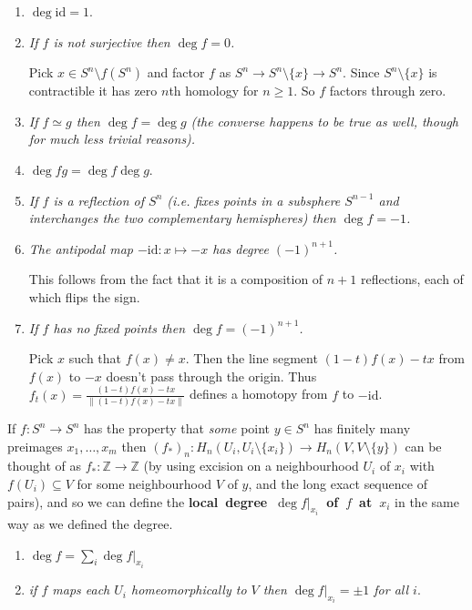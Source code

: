 \documentclass[10pt]{article}
\newcommand{\zz}{\mathbb{Z}}
\newcommand{\id}{\mathrm{id}}
\begin{document}
            \begin{enumerate}
                \item $\deg\id=1$.
                \item \emph{If $f$ is not surjective then $\deg f=0$.}

                    Pick $x\in S^n\setminus f(S^n)$ and factor $f$ as $S^n\to S^n\setminus\{x\}\to S^n$.
                    Since $S^n\setminus\{x\}$ is contractible it has zero $n$th homology for $n\geqslant1$.
                    So $f$ factors through zero.

                \item \emph{If $f\simeq g$ then $\deg f=\deg g$ (the converse happens to be true as well, though for much less trivial reasons).}
                \item $\deg fg=\deg f\deg g$.
                \item \emph{If $f$ is a reflection of $S^n$ (i.e. fixes points in a subsphere $S^{n-1}$ and interchanges the two complementary hemispheres) then $\deg f=-1$.}
                \item \emph{The antipodal map $-\id\colon x\mapsto -x$ has degree $(-1)^{n+1}$.}

                    This follows from the fact that it is a composition of $n+1$ reflections, each of which flips the sign.

                \item \emph{If $f$ has no fixed points then $\deg f=(-1)^{n+1}$.}

                    Pick $x$ such that $f(x)\neq x$.
                    Then the line segment $(1-t)f(x)-tx$ from $f(x)$ to $-x$ doesn't pass through the origin.
                    Thus $f_t(x)=\frac{(1-t)f(x)-tx}{\|(1-t)f(x)-tx\|}$ defines a homotopy from $f$ to $-\id$.
            \end{enumerate}

            If $f\colon S^n\to S^n$ has the property that \emph{some} point $y\in S^n$ has finitely many preimages $x_1,\ldots,x_m$ then $(f_*)_n\colon H_n(U_i,U_i\setminus\{x_i\})\to H_n(V,V\setminus\{y\})$ can be thought of as $f_*\colon\zz\to\zz$ (by using excision on a neighbourhood $U_i$ of $x_i$ with $f(U_i)\subseteq V$ for some neighbourhood $V$ of $y$, and the long exact sequence of pairs), and so we can define the \mbox{\textbf{local degree $\deg f|_{x_i}$ of $f$ at $x_i$}} in the same way as we defined the degree.

            \begin{enumerate}
                \item $\deg f=\sum_i\deg f|_{x_i}$
                \item \emph{if $f$ maps each $U_i$ homeomorphically to $V$ then $\deg f|_{x_i}=\pm1$ for all $i$}.
            \end{enumerate}
\end{document}
